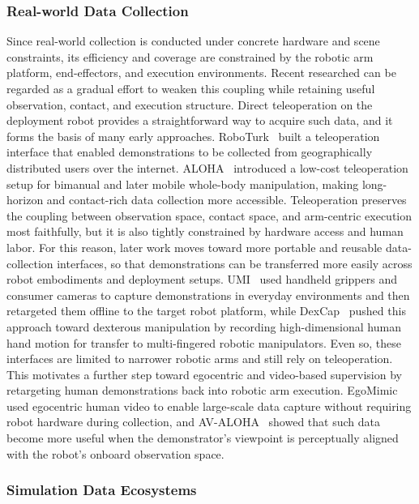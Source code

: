 \documentclass[acmsmall,screen,review]{acmart}
\begin{document}
\subsubsection{Real-world Data Collection}\label{sec:real_acquisition}

Since real-world collection is conducted under concrete hardware and scene constraints, its efficiency and coverage are constrained by the robotic arm platform, end-effectors, and execution environments. 
Recent researched can be regarded as a gradual effort to weaken this coupling while retaining useful observation, contact, and execution structure. 
Direct teleoperation on the deployment robot provides a straightforward way to acquire such data, and it forms the basis of many early approaches.
RoboTurk~\cite{mandlekar2018roboturk} built a teleoperation interface that enabled demonstrations to be collected from geographically distributed users over the internet. 
ALOHA~\cite{zhao2023learning, fu2024mobile} introduced a low-cost teleoperation setup for bimanual and later mobile whole-body manipulation, making long-horizon and contact-rich data collection more accessible. 
Teleoperation preserves the coupling between observation space, contact space, and arm-centric execution most faithfully, but it is also tightly constrained by hardware access and human labor. 
For this reason, later work moves toward more portable and reusable data-collection interfaces, so that demonstrations can be transferred more easily across robot embodiments and deployment setups.
UMI~\cite{chi2024umi} used handheld grippers and consumer cameras to capture demonstrations in everyday environments and then retargeted them offline to the target robot platform, 
while DexCap~\cite{wang2024dexcap} pushed this approach toward dexterous manipulation by recording high-dimensional human hand motion for transfer to multi-fingered robotic manipulators.
Even so, these interfaces are limited to narrower robotic arms and still rely on teleoperation. 
This motivates a further step toward egocentric and video-based supervision by retargeting human demonstrations back into robotic arm execution.
EgoMimic~\cite{kareer2025egomimic} used egocentric human video to enable large-scale data capture without requiring robot hardware during collection, 
and AV-ALOHA~\cite{chuang2025avaloha} showed that such data become more useful when the demonstrator's viewpoint is perceptually aligned with the robot's onboard observation space. 

\subsubsection{Simulation Data Ecosystems}\label{sec:simulation_infrastructure}
\end{document}
